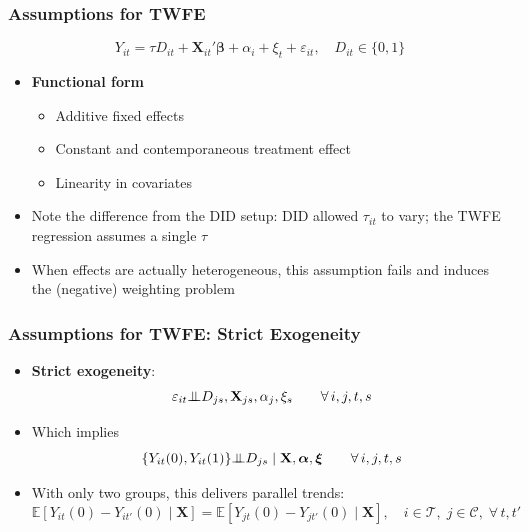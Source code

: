\documentclass[xcolor=svgnames,9pt,english, aspectratio=169]{beamer}
\newcommand{\bs}{\boldsymbol}
\newcommand{\mb}{\mathbf}
\newcommand{\E}{\ensuremath{\mathbb{E}}}
\newcommand{\X}{\ensuremath{\mb{X}}}
\newcommand{\indep}{{\bot\negthickspace\negthickspace\bot}}
\newcommand{\Tset}{\ensuremath{\mathcal{T}}}
\newcommand{\Cset}{\ensuremath{\mathcal{C}}}
\begin{document}
\begin{frame}
  \frametitle{Assumptions for TWFE}
\begin{equation*}
Y_{it} = \tau D_{it} + \X_{it}'\bs{\beta} + \alpha_i + \xi_t + \varepsilon_{it},
\quad D_{it} \in \{0,1\}
\end{equation*}
\bigskip
\begin{itemize}[<+->]\itemsep1em
\item \textbf{Functional form}
\begin{itemize}\itemsep0.4em
  \item Additive fixed effects
  \item \alert{Constant} and contemporaneous treatment effect
  \item Linearity in covariates
\end{itemize}
\item Note the difference from the DID setup: DID allowed $\tau_{it}$ to vary; the TWFE regression assumes a single $\tau$
\item[$\Rightarrow$] When effects are actually heterogeneous, this assumption fails and induces the \alert{(negative) weighting} problem
\end{itemize}
\end{frame}

\begin{frame}
  \frametitle{Assumptions for TWFE: Strict Exogeneity}
\begin{itemize}[<+->]\itemsep1em
\item \textbf{Strict exogeneity}:
\begin{equation*}
\varepsilon_{it} \indep D_{js}, \X_{js}, \alpha_j, \xi_s \qquad \forall\, i, j, t, s
\end{equation*}
\item Which implies
\begin{equation*}
\{Y_{it}(0), Y_{it}(1)\} \indep D_{js} \mid \X, \bs{\alpha}, \bs{\xi} \qquad \forall\, i, j, t, s
\end{equation*}
\item With only two groups, this delivers parallel trends:
\begin{equation*}
\E[Y_{it}(0) - Y_{it'}(0) \mid \X] = \E[Y_{jt}(0) - Y_{jt'}(0) \mid \X], \quad i \in \Tset,\; j \in \Cset,\; \forall\, t, t'
\end{equation*}
\end{itemize}
\end{frame}
\end{document}
